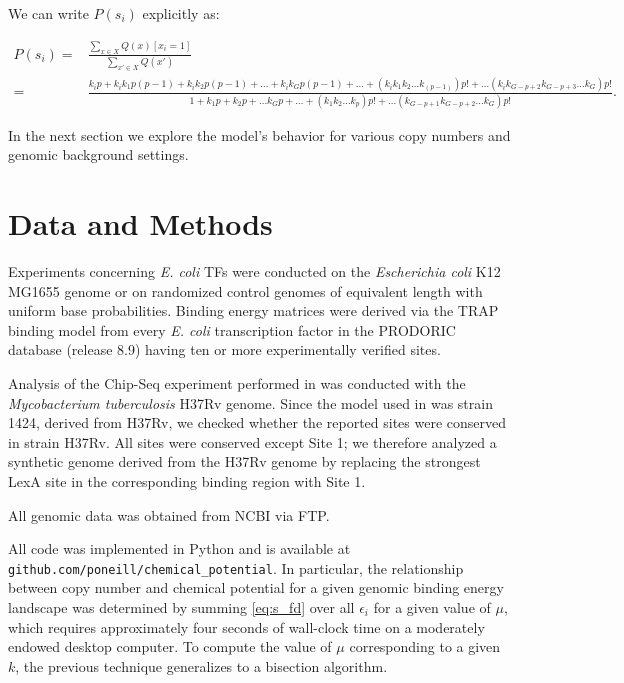 \documentclass{article}
\begin{document}
We can write $P(s_i)$ explicitly as:

\begin{align*}
  P(s_i) =& \frac{\sum_{x\in X}Q(x)[x_i = 1]}{\sum_{x'\in X}Q(x')}\\ 
=& \frac{k_ip + k_ik_1p(p-1) + k_ik_2p(p-1) + \ldots + k_ik_Gp(p-1) + \ldots + (k_ik_1k_2\ldots k_{(p-1)})p! + \ldots (k_ik_{G-p+2}k_{G-p+3}\ldots k_{G})p!}{1 + k_1p + k_2p + \ldots k_Gp + \ldots + (k_1k_2\ldots k_{p})p! + \ldots (k_{G-p+1}k_{G-p+2}\ldots k_{G})p!}.
\end{align*}



In the next section we explore the model's behavior for
various copy numbers and genomic background settings.
\section{Data and Methods}
Experiments concerning \textit{E. coli} TFs were conducted on the
\textit{Escherichia coli} K12 MG1655 genome \cite{blattner97} or on
randomized control genomes of equivalent length with uniform base
probabilities.  Binding energy matrices were derived via the TRAP
binding model \cite{roider07} from every \textit{E. coli}
transcription factor in the PRODORIC database \cite{prodoric03}
(release 8.9) having ten or more experimentally verified sites.

Analysis of the Chip-Seq experiment performed in \cite{smollett12} was
conducted with the \textit{Mycobacterium tuberculosis} H37Rv genome.
Since the model used in \cite{smollett12} was strain 1424, derived
from H37Rv, we checked whether the reported sites were conserved in
strain H37Rv.  All sites were conserved except Site 1; we therefore
analyzed a synthetic genome derived from the H37Rv genome by replacing
the strongest LexA site in the corresponding binding region with Site
1.

All genomic data was obtained from NCBI via FTP.

All code was implemented in Python and is available at
\texttt{github.com/poneill/chemical\_potential}.  In particular, the
relationship between copy number and chemical potential for a given
genomic binding energy landscape was determined by summing
\ref{eq:s_fd} over all $\epsilon_i$ for a given value of $\mu$, which
requires approximately four seconds of wall-clock time on a moderately
endowed desktop computer.  To compute the value of $\mu$ corresponding
to a given $k$, the previous technique generalizes to a bisection
algorithm.
\end{document}
